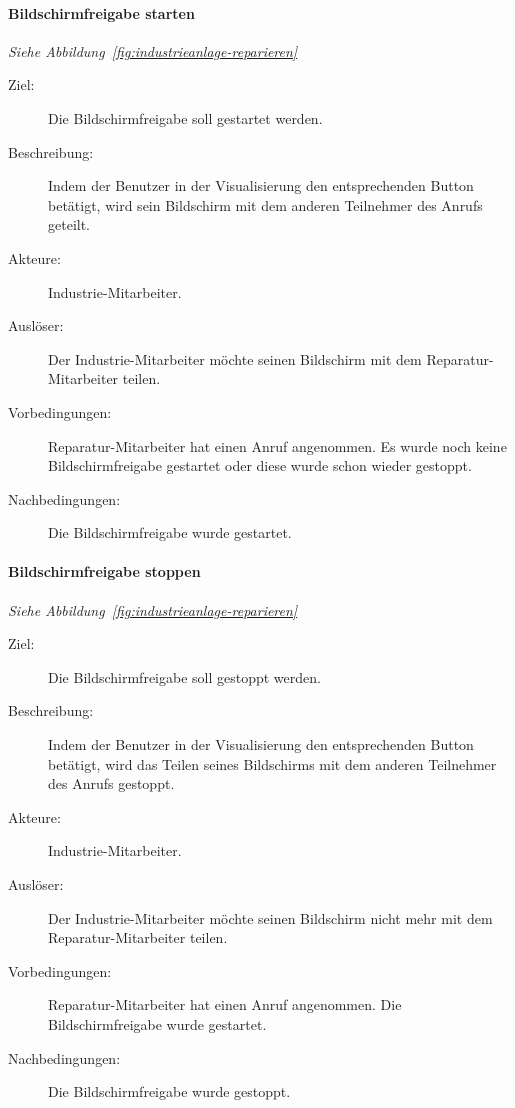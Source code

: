 \paragraph{\large{Bildschirmfreigabe starten}}
\textit{Siehe Abbildung~\ref{fig:industrieanlage-reparieren}}
    \begin{description}
        \item[Ziel:] Die Bildschirmfreigabe soll gestartet werden.
        \item[Beschreibung:] Indem der Benutzer in der Visualisierung den entsprechenden Button betätigt, wird sein Bildschirm mit dem anderen Teilnehmer des Anrufs geteilt.
        \item[Akteure:] Industrie-Mitarbeiter.
        \item[Auslöser:] Der Industrie-Mitarbeiter möchte seinen Bildschirm mit dem Reparatur-Mitarbeiter teilen.
        \item[Vorbedingungen:] Reparatur-Mitarbeiter hat einen Anruf angenommen.
            Es wurde noch keine Bildschirmfreigabe gestartet oder diese wurde schon wieder gestoppt.
        \item[Nachbedingungen:] Die Bildschirmfreigabe wurde gestartet.
    \end{description}

\paragraph{\large{Bildschirmfreigabe stoppen}}
\textit{Siehe Abbildung~\ref{fig:industrieanlage-reparieren}}
    \begin{description}
        \item[Ziel:] Die Bildschirmfreigabe soll gestoppt werden.
        \item[Beschreibung:] Indem der Benutzer in der Visualisierung den entsprechenden Button betätigt, wird das Teilen seines Bildschirms mit dem anderen Teilnehmer des Anrufs gestoppt.
        \item[Akteure:] Industrie-Mitarbeiter.
        \item[Auslöser:] Der Industrie-Mitarbeiter möchte seinen Bildschirm nicht mehr mit dem Reparatur-Mitarbeiter teilen.
        \item[Vorbedingungen:] Reparatur-Mitarbeiter hat einen Anruf angenommen.
            Die Bildschirmfreigabe wurde gestartet.
        \item[Nachbedingungen:] Die Bildschirmfreigabe wurde gestoppt.
    \end{description}

